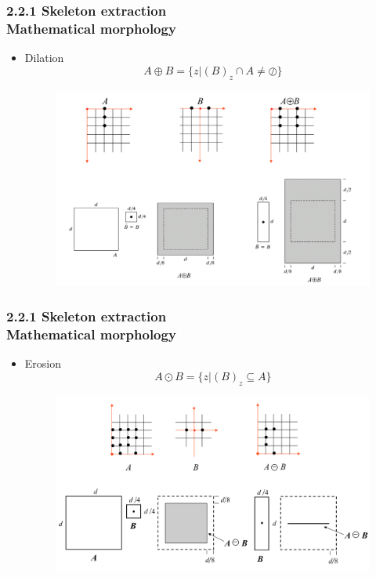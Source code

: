 \documentclass[notheorems,serif,table,compress]{beamer}  %
\begin{document}
\begin{frame}
\frametitle{2.2.1 Skeleton extraction \\ \normalsize{Mathematical morphology}}
    \begin{itemize}
        \item Dilation
           \begin{displaymath}
             A \oplus B= \{z|(B)_{z}\cap A\ne \oslash\}
           \end{displaymath} 
           \begin{figure}
              \centering
              \includegraphics[width=0.7\linewidth]{dil} 
            \end{figure}
    \end{itemize}
\end{frame}

\begin{frame}
\frametitle{2.2.1 Skeleton extraction \\ \normalsize{Mathematical morphology}}
    \begin{itemize}
        \item Erosion
           \begin{displaymath}
             A \odot B= \{z|(B)_{z}\subseteq A\}
           \end{displaymath} 
            \begin{figure}
              \centering
              \includegraphics[width=0.7\linewidth]{ero} 
            \end{figure}
    \end{itemize}
\end{frame}
\end{document}
